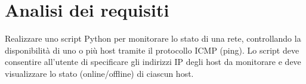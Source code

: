 \documentclass[a4paper,12pt]{report}
\begin{document}
\section{Analisi dei requisiti}

Realizzare uno script Python per monitorare lo stato di una rete, controllando la disponibilità di uno o più host tramite il protocollo ICMP (ping).
%
Lo script deve consentire all'utente di specificare gli indirizzi IP degli host da monitorare e deve visualizzare lo stato (online/offline) di ciascun host.
\end{document}
